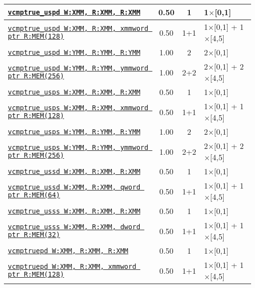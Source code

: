 \documentclass[a4paper,english,fontsize=9]{scrartcl}
\begin{document}
\begin{longtable}{p{}ccL{.25\textwidth}}
  \midrule
  \texttt{\href{https://felixcloutier.com/x86/CMPPD.html}{vcmptrue\_uspd W:XMM, R:XMM, R:XMM}} & 0.50 & 1 & 1\(\times\)[0,1] \\
  \midrule
  \texttt{\href{https://felixcloutier.com/x86/CMPPD.html}{vcmptrue\_uspd W:XMM, R:XMM, xmmword ptr R:MEM(128)}} & 0.50 & 1+1 & 1\(\times\)[0,1] + 1\(\times\)[4,5] \\
  \midrule
  \texttt{\href{https://felixcloutier.com/x86/CMPPD.html}{vcmptrue\_uspd W:YMM, R:YMM, R:YMM}} & 1.00 & 2 & 2\(\times\)[0,1] \\
  \midrule
  \texttt{\href{https://felixcloutier.com/x86/CMPPD.html}{vcmptrue\_uspd W:YMM, R:YMM, ymmword ptr R:MEM(256)}} & 1.00 & 2+2 & 2\(\times\)[0,1] + 2\(\times\)[4,5] \\
  \midrule
  \texttt{\href{https://felixcloutier.com/x86/CMPPS.html}{vcmptrue\_usps W:XMM, R:XMM, R:XMM}} & 0.50 & 1 & 1\(\times\)[0,1] \\
  \midrule
  \texttt{\href{https://felixcloutier.com/x86/CMPPS.html}{vcmptrue\_usps W:XMM, R:XMM, xmmword ptr R:MEM(128)}} & 0.50 & 1+1 & 1\(\times\)[0,1] + 1\(\times\)[4,5] \\
  \midrule
  \texttt{\href{https://felixcloutier.com/x86/CMPPS.html}{vcmptrue\_usps W:YMM, R:YMM, R:YMM}} & 1.00 & 2 & 2\(\times\)[0,1] \\
  \midrule
  \texttt{\href{https://felixcloutier.com/x86/CMPPS.html}{vcmptrue\_usps W:YMM, R:YMM, ymmword ptr R:MEM(256)}} & 1.00 & 2+2 & 2\(\times\)[0,1] + 2\(\times\)[4,5] \\
  \midrule
  \texttt{\href{https://felixcloutier.com/x86/CMPSD.html}{vcmptrue\_ussd W:XMM, R:XMM, R:XMM}} & 0.50 & 1 & 1\(\times\)[0,1] \\
  \midrule
  \texttt{\href{https://felixcloutier.com/x86/CMPSD.html}{vcmptrue\_ussd W:XMM, R:XMM, qword ptr R:MEM(64)}} & 0.50 & 1+1 & 1\(\times\)[0,1] + 1\(\times\)[4,5] \\
  \midrule
  \texttt{\href{https://felixcloutier.com/x86/CMPSS.html}{vcmptrue\_usss W:XMM, R:XMM, R:XMM}} & 0.50 & 1 & 1\(\times\)[0,1] \\
  \midrule
  \texttt{\href{https://felixcloutier.com/x86/CMPSS.html}{vcmptrue\_usss W:XMM, R:XMM, dword ptr R:MEM(32)}} & 0.50 & 1+1 & 1\(\times\)[0,1] + 1\(\times\)[4,5] \\
  \midrule
  \texttt{\href{https://felixcloutier.com/x86/CMPPD.html}{vcmptruepd W:XMM, R:XMM, R:XMM}} & 0.50 & 1 & 1\(\times\)[0,1] \\
  \midrule
  \texttt{\href{https://felixcloutier.com/x86/CMPPD.html}{vcmptruepd W:XMM, R:XMM, xmmword ptr R:MEM(128)}} & 0.50 & 1+1 & 1\(\times\)[0,1] + 1\(\times\)[4,5] \\

\end{longtable}
\end{document}
